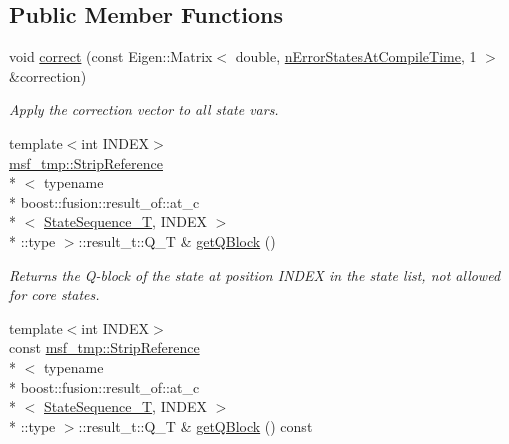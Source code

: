 \subsection*{Public Member Functions}
\begin{DoxyCompactItemize}
\item 
\hypertarget{structmsf__core_1_1GenericState__T_acc97b8f5fe79d78dd1528b7c57100c5d}{void \hyperlink{structmsf__core_1_1GenericState__T_acc97b8f5fe79d78dd1528b7c57100c5d}{correct} (const Eigen\-::\-Matrix$<$ double, \hyperlink{structmsf__core_1_1GenericState__T_a20545d9aacd8f84bc1a97a873310cd5fab0136c5805e4e8d75677885fcaad5901}{n\-Error\-States\-At\-Compile\-Time}, 1 $>$ \&correction)}\label{structmsf__core_1_1GenericState__T_acc97b8f5fe79d78dd1528b7c57100c5d}

\begin{DoxyCompactList}\small\item\em Apply the correction vector to all state vars. \end{DoxyCompactList}\item 
\hypertarget{structmsf__core_1_1GenericState__T_a34e6c50f303098c763a02fbe8c3b673e}{{\footnotesize template$<$int I\-N\-D\-E\-X$>$ }\\\hyperlink{structmsf__tmp_1_1StripReference}{msf\-\_\-tmp\-::\-Strip\-Reference}\\*
$<$ typename \\*
boost\-::fusion\-::result\-\_\-of\-::at\-\_\-c\\*
$<$ \hyperlink{structmsf__core_1_1GenericState__T_a75fe70f7c7517dbf7d4c91b75b08a1dd}{State\-Sequence\-\_\-\-T}, I\-N\-D\-E\-X $>$\\*
\-::type $>$\-::result\-\_\-t\-::\-Q\-\_\-\-T \& \hyperlink{structmsf__core_1_1GenericState__T_a34e6c50f303098c763a02fbe8c3b673e}{get\-Q\-Block} ()}\label{structmsf__core_1_1GenericState__T_a34e6c50f303098c763a02fbe8c3b673e}

\begin{DoxyCompactList}\small\item\em Returns the Q-\/block of the state at position I\-N\-D\-E\-X in the state list, not allowed for core states. \end{DoxyCompactList}\item 
\hypertarget{structmsf__core_1_1GenericState__T_adde836b510073015d9ec54ed6b2bf971}{{\footnotesize template$<$int I\-N\-D\-E\-X$>$ }\\const \hyperlink{structmsf__tmp_1_1StripReference}{msf\-\_\-tmp\-::\-Strip\-Reference}\\*
$<$ typename \\*
boost\-::fusion\-::result\-\_\-of\-::at\-\_\-c\\*
$<$ \hyperlink{structmsf__core_1_1GenericState__T_a75fe70f7c7517dbf7d4c91b75b08a1dd}{State\-Sequence\-\_\-\-T}, I\-N\-D\-E\-X $>$\\*
\-::type $>$\-::result\-\_\-t\-::\-Q\-\_\-\-T \& \hyperlink{structmsf__core_1_1GenericState__T_adde836b510073015d9ec54ed6b2bf971}{get\-Q\-Block} () const }\label{structmsf__core_1_1GenericState__T_adde836b510073015d9ec54ed6b2bf971}


\end{DoxyCompactItemize}
